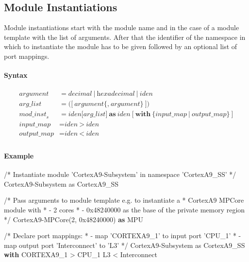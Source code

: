 \documentclass[a4paper,11pt,twoside]{report}
\begin{document}
{{{\subsection{Module Instantiations}
Module instantiations start with the module name and in the case of a module template with the list of arguments.
After that the identifier of the namespace in which to instantiate the module has to be given followed by an optional list of port mappings.

\paragraph{Syntax}
\begin{align*}
    \textit{argument} & \mathop{=}
        \textit{decimal}\ |\ \textit{hexadecimal}\ |\ \textit{iden}\\
    \textit{arg\_list} & \mathop{=}
        \textbf{(}\big[\ 
            \textit{argument}\big\{\textbf{,}\ \textit{argument}\big\}\ 
        \big] \textbf{)}\\
    \textit{mod\_inst}_s & \mathop{=}
        \textit{iden} \big[\textit{arg\_list}\big]\ \textbf{as}\ \textit{iden}\ \big[\ 
            \textbf{with}\ \big\{\textit{input\_map}\ |\ \textit{output\_map}\big\}\ 
        \big]\\
    \textit{input\_map} & \mathop{=}
        \textit{iden}\ \textbf{>}\ \textit{iden}\\
    \textit{output\_map} & \mathop{=}
        \textit{iden}\ \textbf{<}\ \textit{iden}\\
\end{align*}

\clearpage
\paragraph{Example}
\begin{syntax}
    /* Instantiate module 'CortexA9-Subsystem' in namespace 'CortexA9_SS' */
    CortexA9-Subsystem as CortexA9_SS

    /* Pass arguments to module template e.g. to instantiate a
     * CortexA9 MPCore module with
     * - 2 cores
     * - 0x48240000 as the base of the private memory region
     */
    CortexA9-MPCore(2, 0x48240000) \textbf{as} MPU

    /* Declare port mappings:
     * - map 'CORTEXA9_1' to input port 'CPU_1'
     * - map output port 'Interconnect' to 'L3'
     */
    CortexA9-Subsystem as CortexA9_SS \textbf{with}
        CORTEXA9_1 > CPU_1
        L3 < Interconnect
\end{syntax}

}}}
\end{document}
